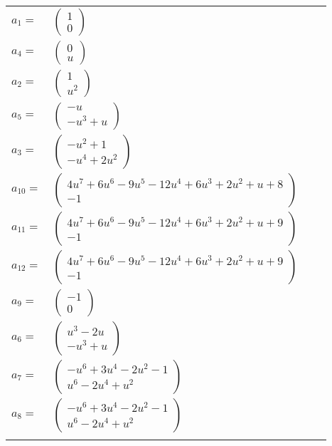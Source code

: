 \documentclass[1p]{elsarticle_modified}
\theoremstyle{definition}
\begin{document}
\begin{tabular}{m{7pt} m{180pt} m{7pt} m{180pt} }
\flushright $a_{1}=$&$\begin{pmatrix}1\\0\end{pmatrix}$ \\
\flushright $a_{4}=$&$\begin{pmatrix}0\\u\end{pmatrix}$ \\
\flushright $a_{2}=$&$\begin{pmatrix}1\\u^2\end{pmatrix}$ \\
\flushright $a_{5}=$&$\begin{pmatrix}- u\\- u^3+u\end{pmatrix}$ \\
\flushright $a_{3}=$&$\begin{pmatrix}- u^2+1\\- u^4+2 u^2\end{pmatrix}$ \\
\flushright $a_{10}=$&$\begin{pmatrix}4 u^7+6 u^6-9 u^5-12 u^4+6 u^3+2 u^2+u+8\\-1\end{pmatrix}$ \\
\flushright $a_{11}=$&$\begin{pmatrix}4 u^7+6 u^6-9 u^5-12 u^4+6 u^3+2 u^2+u+9\\-1\end{pmatrix}$ \\
\flushright $a_{12}=$&$\begin{pmatrix}4 u^7+6 u^6-9 u^5-12 u^4+6 u^3+2 u^2+u+9\\-1\end{pmatrix}$ \\
\flushright $a_{9}=$&$\begin{pmatrix}-1\\0\end{pmatrix}$ \\
\flushright $a_{6}=$&$\begin{pmatrix}u^3-2 u\\- u^3+u\end{pmatrix}$ \\
\flushright $a_{7}=$&$\begin{pmatrix}- u^6+3 u^4-2 u^2-1\\u^6-2 u^4+u^2\end{pmatrix}$ \\
\flushright $a_{8}=$&$\begin{pmatrix}- u^6+3 u^4-2 u^2-1\\u^6-2 u^4+u^2\end{pmatrix}$\\&\end{tabular}
\end{document}

